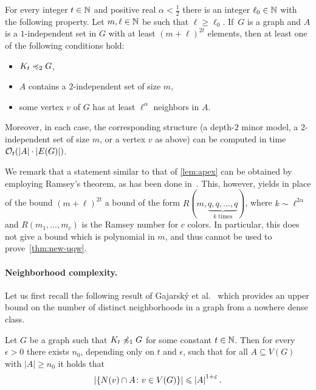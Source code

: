 \begin{lemma}\label{lem:apex}
For every integer $t\in \mathbb{N}$ and positive real $\alpha<\frac 1 2$ 
there is an integer $\ell_0\in\mathbb{N}$ with the following property.
Let $m,\ell\in \mathbb{N}$ be such that $\ell\ge \ell_0$. 
If~$G$ is a graph and $A$ is a $1$-independent set in $G$
with at least $(m+\ell)^{2t}$ elements,
then at least one of the following conditions hold:
\begin{itemize}
  \item $K_t\preccurlyeq_{2} G$,
\item  $A$ contains a $2$-independent set of size $m$, 
\item  some vertex $v$ of $G$
has at least $\ell^{\alpha}$ neighbors in $A$.
\end{itemize}
Moreover, in each case, the corresponding structure (a depth-$2$ minor model, a $2$-independent set of size $m$, or a vertex $v$ as above) can be computed in time $\mathcal{O}_t(|A|\cdot |E(G)|)$.
\end{lemma}

We remark that a statement similar to that of \cref{lem:apex}
can be obtained by employing Ramsey's theorem, as has been done in~\cite{nevsetvril2011nowhere}. This, however, yields
in place of the bound $(m+\ell)^{2t}$ a bound of the form $R(m,\underbrace{q,q,\ldots,q}_{k\text{ times}})$,
where $k\sim\ell^{2\alpha}$ and $R(m_1,\ldots,m_c)$
is the Ramsey number for $c$ colors.
In particular, this does not give a bound which is polynomial in $m$, and thus cannot be used to prove~\cref{thm:new-uqw}.

\paragraph*{Neighborhood complexity.} Let us first recall the following result of Gajarsk\'y et al.~\cite{gajarsky2017kernelization}
which provides an upper bound on the number of distinct neighborhoods in a graph from a nowhere dense class.

\begin{lemma}\label{lem:diversity}
Let $G$ be a graph such that $K_t\not\preccurlyeq_{1} G$ for some constant $t\in \mathbb{N}$. 
Then for every $\epsilon>0$ there exists $n_0$, depending only on $t$ and $\epsilon$, such that for all $A\subseteq V(G)$ with $|A|\geq n_0$ it holds that
\[\left\lvert\{N(v)\cap A \colon v\in V(G)\}\right\rvert\leqslant\left\lvert A\right\rvert^{1+\varepsilon}.\]
\end{lemma}



